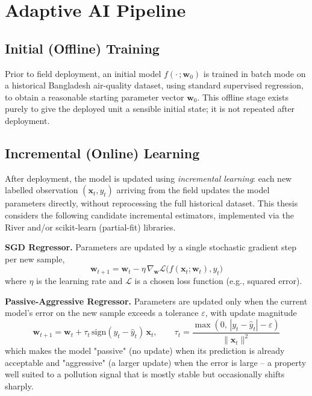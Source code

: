 \FloatBarrier

\section{Adaptive AI Pipeline}
\label{sec:meth-ai-pipeline}

\subsection{Initial (Offline) Training}
Prior to field deployment, an initial model $f(\cdot\,;\mathbf{w}_0)$ is trained in batch mode on a historical Bangladesh air-quality dataset, using standard supervised regression, to obtain a reasonable starting parameter vector $\mathbf{w}_0$. This offline stage exists purely to give the deployed unit a sensible initial state; it is not repeated after deployment.

\subsection{Incremental (Online) Learning}
After deployment, the model is updated using \emph{incremental learning}: each new labelled observation $(\mathbf{x}_t, y_t)$ arriving from the field updates the model parameters directly, without reprocessing the full historical dataset. This thesis considers the following candidate incremental estimators, implemented via the River and/or scikit-learn (partial-fit) libraries.

\textbf{SGD Regressor.} Parameters are updated by a single stochastic gradient step per new sample,
\begin{equation}
\mathbf{w}_{t+1} = \mathbf{w}_t - \eta \, \nabla_{\mathbf{w}} \mathcal{L}\big(f(\mathbf{x}_t;\mathbf{w}_t), y_t\big)
\label{eq:sgd}
\end{equation}
where $\eta$ is the learning rate and $\mathcal{L}$ is a chosen loss function (e.g., squared error).

\textbf{Passive-Aggressive Regressor.} Parameters are updated only when the current model's error on the new sample exceeds a tolerance $\varepsilon$, with update magnitude
\begin{equation}
\mathbf{w}_{t+1} = \mathbf{w}_t + \tau_t\, \text{sign}(y_t - \hat{y}_t)\, \mathbf{x}_t, \qquad
\tau_t = \frac{\max(0,\, |y_t - \hat{y}_t| - \varepsilon)}{\lVert \mathbf{x}_t \rVert^2}
\label{eq:pa}
\end{equation}
which makes the model "passive" (no update) when its prediction is already acceptable and "aggressive" (a larger update) when the error is large -- a property well suited to a pollution signal that is mostly stable but occasionally shifts sharply.

